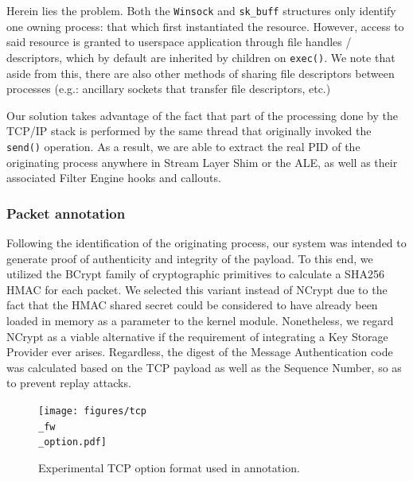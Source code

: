 Herein lies the problem. Both the \texttt{Winsock} and \texttt{sk\_buff} structures only identify one owning process: that which first instantiated the resource. However, access to said resource is granted to userspace application through file handles / descriptors, which by default are inherited by children on \texttt{exec()}. We note that aside from this, there are also other methods of sharing file descriptors between processes (e.g.: ancillary sockets that transfer file descriptors, etc.)

Our solution takes advantage of the fact that part of the processing done by the TCP/IP stack is performed by the same thread that originally invoked the \texttt{send()} operation. As a result, we are able to extract the real PID of the originating process anywhere in Stream Layer Shim or the ALE, as well as their associated Filter Engine hooks and callouts.


\subsubsection{Packet annotation}
\label{sign:windows:implementation:annotation}

Following the identification of the originating process, our system was intended to generate proof of authenticity and integrity of the payload. To this end, we utilized the BCrypt family of cryptographic primitives to calculate a SHA256 HMAC for each packet. We selected this variant instead of NCrypt due to the fact that the HMAC shared secret could be considered to have already been loaded in memory as a parameter to the kernel module. Nonetheless, we regard NCrypt as a viable alternative if the requirement of integrating a Key Storage Provider ever arises. Regardless, the digest of the Message Authentication code was calculated based on the TCP payload as well as the Sequence Number, so as to prevent replay attacks.

\begin{figure}[h]
    \centering
    \texttt{[image: figures/tcp\\\_fw\\\_option.pdf]}
    \caption{Experimental TCP option format used in annotation.}
    \label{sign:windows:fig:tcp-fw-option}
\end{figure}

